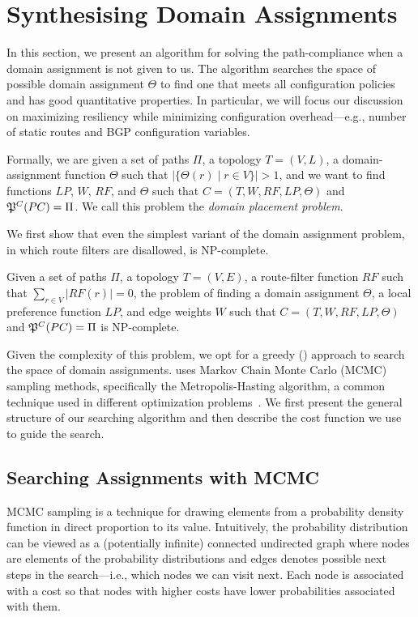 \section{Synthesising Domain Assignments}
\label{sec:synth-dom-ass}

In this section, we present an algorithm for 
solving the path-compliance when a domain assignment is not given to us.
The algorithm searches the space of possible domain assignment $\Theta$ to find
one that meets all configuration policies and has good quantitative properties.
In particular, we will focus our discussion on maximizing resiliency while minimizing
configuration overhead---e.g., number of static routes and BGP configuration variables. 

Formally, we are given a set of paths $\Pi$,
a topology $T=(V,L)$,
a domain-assignment function $\Theta$ such that $|\{\Theta(r) \mid r\in V\}|>1$, 
and we want to find functions
$LP$, $W$, $RF$,  and $\Theta$ such that
$C=(T,W,RF,LP,\Theta)$ and
$\mathfrak{P}^C(PC) = \Pi$.
We call this problem the \emph{domain placement problem}.

We first show that even the simplest variant of the domain assignment problem,
in which route filters are disallowed, is NP-complete.
\begin{theorem}
Given a set of paths $\Pi$,
a topology $T=(V,E)$, 
a route-filter function $RF$ such that $\sum_{r\in V} |RF(r)|=0$,
the problem of finding 
a domain assignment $\Theta$, 
a local preference function $LP$,
and edge weights $W$
 such that
$C=(T,W,RF,LP,\Theta)$ and
$\mathfrak{P}^C(PC) = \Pi$  is NP-complete.
\end{theorem}

Given the complexity of this problem, we opt for a greedy
() approach
to  search the space of domain
assignments. 
\name uses Markov
Chain Monte Carlo (MCMC) sampling methods, specifically the Metropolis-Hasting
algorithm, a common technique used in different optimization 
problems~\cite{stoke}. 
We first present the general structure of our searching algorithm and 
then describe the cost function we use to guide the search.

\subsection{Searching Assignments with MCMC}
MCMC sampling is a technique for 
drawing elements from a
probability density function in direct proportion to its value.
Intuitively, the probability distribution can be viewed as a (potentially infinite) 
connected undirected graph
where nodes are elements of the probability distributions
and edges denotes possible next steps in the search---i.e.,
which nodes we can visit next.
Each node is associated with a cost so that nodes with higher costs have lower
probabilities associated with them.

